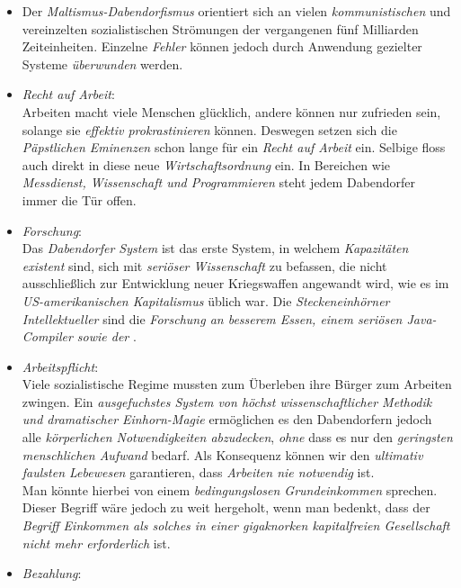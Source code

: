 \begin{itemize}
\item Der \textit{Maltismus-Dabendorfismus} orientiert sich an vielen \textit{kommunistischen} und vereinzelten sozialistischen Strömungen der vergangenen fünf Milliarden Zeiteinheiten. Einzelne \textit{Fehler} können jedoch durch Anwendung gezielter Systeme \textit{überwunden} werden.
\item \textit{Recht auf Arbeit}:\\
Arbeiten macht viele Menschen glücklich, andere können nur zufrieden sein, solange sie \textit{effektiv prokrastinieren} können. Deswegen setzen sich die \textit{Päpstlichen Eminenzen} schon lange für ein \textit{Recht auf Arbeit} ein. Selbige floss auch direkt in diese neue \textit{Wirtschaftsordnung} ein. In Bereichen wie \textit{Messdienst, Wissenschaft und Programmieren} steht jedem Dabendorfer immer die Tür offen.
\item \textit{Forschung}:\\
Das \textit{Dabendorfer System} ist das erste System, in welchem \textit{Kapazitäten existent} sind, sich mit \textit{seriöser Wissenschaft} zu befassen, die nicht ausschließlich zur Entwicklung neuer Kriegswaffen angewandt wird, wie es im \textit{US-amerikanischen Kapitalismus} üblich war. Die \textit{Steckeneinhörner Intellektueller} sind die \textit{Forschung an besserem Essen, einem seriösen Java-Compiler sowie der }.
\item \textit{Arbeitspflicht}:\\
Viele sozialistische Regime mussten zum Überleben ihre Bürger zum Arbeiten zwingen. Ein \textit{ausgefuchstes System von höchst wissenschaftlicher Methodik und dramatischer Einhorn-Magie} ermöglichen es den Dabendorfern jedoch alle \textit{körperlichen Notwendigkeiten abzudecken}, \textit{ohne} dass es nur den \textit{geringsten menschlichen Aufwand} bedarf. Als Konsequenz können wir den \textit{ultimativ faulsten Lebewesen} garantieren, dass \textit{Arbeiten nie notwendig} ist.\\
Man könnte hierbei von einem \textit{bedingungslosen Grundeinkommen} sprechen. Dieser Begriff wäre jedoch zu weit hergeholt, wenn man bedenkt, dass der \textit{Begriff Einkommen als solches in einer gigaknorken kapitalfreien Gesellschaft nicht mehr erforderlich} ist.
\item \textit{Bezahlung}:\\

\end{itemize}
